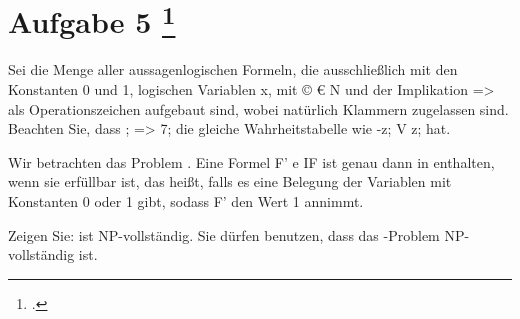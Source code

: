 \documentclass{lehramt-informatik-aufgabe}
\begin{document}
\liAufgabenTitel{}
\section{Aufgabe 5
\footcite{examen:66115:2020:09}}

Sei  die Menge aller aussagenlogischen Formeln, die ausschließlich mit
den Konstanten 0 und 1, logischen Variablen x, mit © € N und der
Implikation => als Operationszeichen aufgebaut sind, wobei natürlich
Klammern zugelassen sind. Beachten Sie, dass ; => 7; die gleiche
Wahrheitstabelle wie -z; V z; hat.

Wir betrachten das Problem . Eine Formel F' e IF ist
genau dann in  enthalten, wenn sie erfüllbar ist,
das heißt, falls es eine Belegung der Variablen mit Konstanten 0 oder 1
gibt, sodass F' den Wert 1 annimmt.

Zeigen Sie:  ist NP-vollständig. Sie dürfen
benutzen, dass das -Problem NP-vollständig ist.

\begin{liAntwort}

\end{liAntwort}
\end{document}
